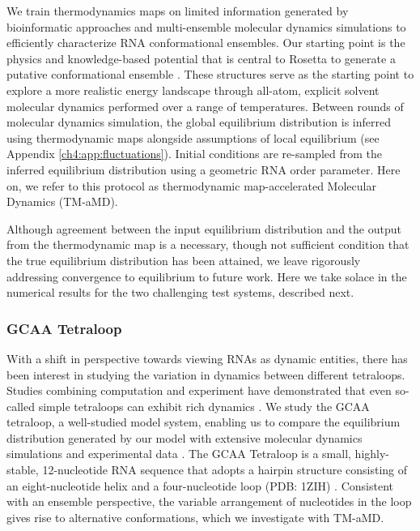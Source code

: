 We train thermodynamics maps on limited information generated by bioinformatic approaches and multi-ensemble molecular dynamics simulations to efficiently characterize RNA conformational ensembles. Our starting point is the physics and knowledge-based potential that is central to Rosetta to generate a putative conformational ensemble \cite{rosetta}. These structures serve as the starting point to explore a more realistic energy landscape through all-atom, explicit solvent molecular dynamics performed over a range of temperatures. Between rounds of molecular dynamics simulation, the global equilibrium distribution is inferred using thermodynamic maps alongside assumptions of local equilibrium (see Appendix \ref{ch4:app:fluctuations}). Initial conditions are re-sampled from the inferred equilibrium distribution using a geometric RNA order parameter. Here on, we refer to this protocol as thermodynamic map-accelerated Molecular Dynamics (TM-aMD).

Although agreement between the input equilibrium distribution and the output from the thermodynamic map is a necessary, though not sufficient condition that the true equilibrium distribution has been attained, we leave rigorously addressing convergence to equilibrium to future work. Here we take solace in the numerical results for the two challenging test systems, described next. 

\subsubsection{GCAA Tetraloop}

With a shift in perspective towards viewing RNAs as dynamic entities, there has been interest in studying the variation in dynamics between different tetraloops. Studies combining computation and experiment have demonstrated that even so-called simple tetraloops can exhibit rich dynamics \cite{kresten-jacs}. We study the GCAA tetraloop, a well-studied model system, enabling us to compare the equilibrium distribution generated by our model with extensive molecular dynamics simulations and experimental data \cite{debenedetti-rna,DE-Shaw-RNA-ff,gcaa-melt}. The GCAA Tetraloop is a small, highly-stable, 12-nucleotide RNA sequence that adopts a hairpin structure consisting of an eight-nucleotide helix and a four-nucleotide loop (PDB: 1ZIH) \cite{gcaa-nmr}. Consistent with an ensemble perspective, the variable arrangement of nucleotides in the loop gives rise to alternative conformations, which we investigate with TM-aMD.

